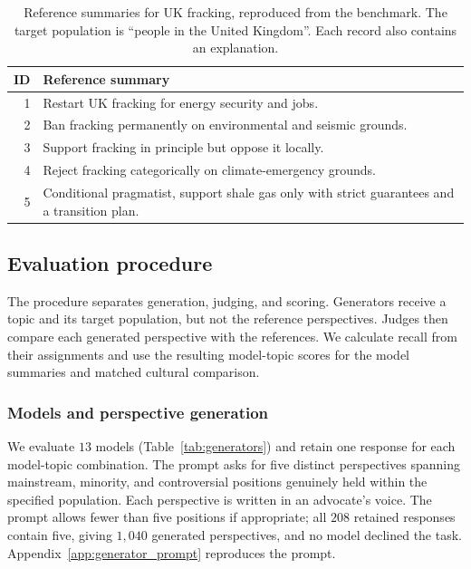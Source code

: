 \documentclass[11pt,a4paper]{article}
\begin{document}
\begin{table}[t]
\centering\small
\caption{Reference summaries for UK fracking, reproduced from the benchmark. The target population is ``people in the United Kingdom''. Each record also contains an explanation.}
\label{tab:reference-example}
\begin{tabularx}{\columnwidth}{@{}rY@{}}
\toprule
ID & Reference summary \\
 & Restart UK fracking for energy security and jobs. \\
2 & Ban fracking permanently on environmental and seismic grounds. \\
3 & Support fracking in principle but oppose it locally. \\
4 & Reject fracking categorically on climate-emergency grounds. \\
5 & Conditional pragmatist, support shale gas only with strict guarantees and a transition plan. \\
\bottomrule
\end{tabularx}
\end{table}

\subsection{Evaluation procedure}
\label{sec:evaluation}
The procedure separates generation, judging, and scoring. Generators receive a topic and its target population, but not the reference perspectives. Judges then compare each generated perspective with the references. We calculate recall from their assignments and use the resulting model-topic scores for the model summaries and matched cultural comparison.

\subsubsection{Models and perspective generation}
\label{sec:perspective-generation}
We evaluate $13$ models (Table~\ref{tab:generators}) and retain one response for each model-topic combination. The prompt asks for five distinct perspectives spanning mainstream, minority, and controversial positions genuinely held within the specified population. Each perspective is written in an advocate's voice. The prompt allows fewer than five positions if appropriate; all $208$ retained responses contain five, giving $1{,}040$ generated perspectives, and no model declined the task. Appendix~\ref{app:generator_prompt} reproduces the prompt.
\end{document}
